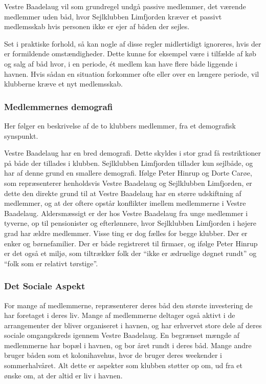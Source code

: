 Vestre Baadelaug vil som grundregel undgå passive medlemmer, det værende medlemmer uden båd, hvor Sejlklubben Limfjorden kræver et passivt medlemsskab hvis personen ikke er ejer af båden der sejles.

Set i praktiske forhold, så kan nogle af disse regler midlertidigt ignoreres, hvis der er formildende omstændigheder. Dette kunne for eksempel være i tilfælde af køb og salg af båd hvor, i en periode, ét medlem kan have flere både liggende i havnen. Hvis sådan en situation forkommer ofte eller over en længere periode, vil klubberne kræve et nyt medlemsskab.

\subsubsection{Medlemmernes demografi}

Her følger en beskrivelse af de to klubbers medlemmer, fra et demografisk synspunkt.

Vestre Baadelaug har en bred demografi. Dette skyldes i stor grad få restriktioner på både der tillades i klubben. Sejlklubben Limfjorden tillader kun sejlbåde, og har af denne grund en smallere demografi. Ifølge Peter Hinrup og Dorte Carøe, som repræsenterer henholdsvis Vestre Baadelaug og Sejlklubben Limfjorden, er dette den direkte grund til at Vestre Baadelaug har en større udskiftning af medlemmer, og at der oftere opstår konflikter imellem medlemmerne i Vestre Baadelaug. Aldersmæssigt er der hos Vestre Baadelaug fra unge medlemmer i tyverne, op til pensionister og efterlønnere, hvor Sejlklubben Limfjorden i højere grad har ældre medlemmer. Visse ting er dog fælles for begge klubber. Der er enker og børnefamilier. Der er både registreret til firmaer, og ifølge Peter Hinrup er det også et miljø, som tiltrækker folk der \enquote{ikke er ædruelige døgnet rundt} og \enquote{folk som er relativt tørstige}.


\subsubsection{Det Sociale Aspekt}

For mange af medlemmerne, repræsenterer deres båd den største investering de har foretaget i deres liv. Mange af medlemmerne deltager også aktivt i de arrangementer der bliver organiseret i havnen, og har erhvervet store dele af deres sociale omgangskreds igennem Vestre Baadelaug. En begrænset mængde af medlemmerne har bopæl i havnen, og bor året rundt i deres båd. Mange andre bruger båden som et kolonihavehus, hvor de bruger deres weekender i sommerhalvåret. Alt dette er aspekter som klubben støtter op om, ud fra et ønske om, at der altid er liv i havnen.



